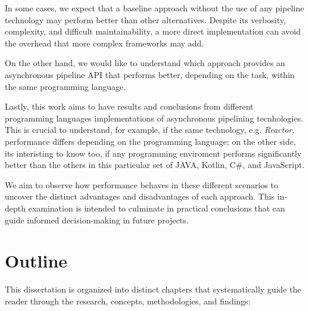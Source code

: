 In some cases, we expect that a baseline approach without the use of any pipeline technology may perform better than other alternatives. Despite its verbosity, complexity, and difficult maintainability, a more direct implementation can avoid the overhead that more complex frameworks may add.

On the other hand, we would like to understand which approach provides an asynchronous pipeline API that performs better, depending on the task, within the same programming language.

Lastly, this work aims to have results and conclusions from different programming languages implementations of asynchronous pipelining tecnhologies. This is crucial to understand, for example, if the same technology, e.g. \textit{Reactor}, performance differs depending on the programming language; on the other side, its interisting to know too, if any programming enviroment performs significantly better than the others in this particular set of   JAVA, Kotlin, C\#, and JavaScript. 

We aim to observe how performance behaves in these different scenarios to uncover the distinct advantages and disadvantages of each approach. This in-depth examination is intended to culminate in practical conclusions that can guide informed decision-making in future projects.

\section{Outline}
\label{sec:outline}

This dissertation is organized into distinct chapters that systematically guide the reader through the research, concepts, methodologies, and findings:

